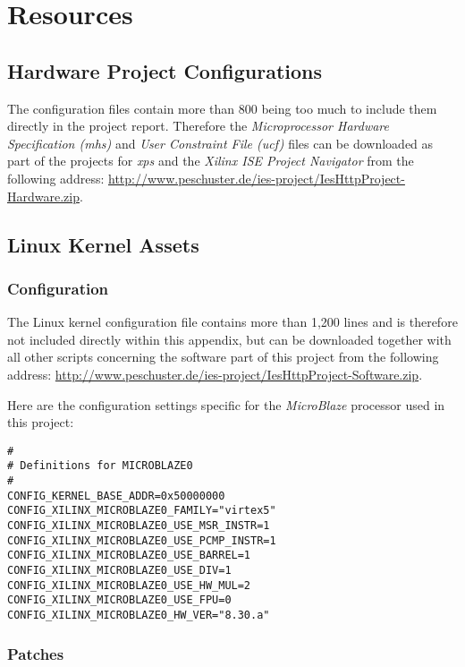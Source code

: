 \appendix 

\chapter{Resources}

\section{Hardware Project Configurations}

The configuration files contain more than 800 being too much to include them directly in the project report. Therefore the \textit{Microprocessor Hardware Specification (mhs)} and \textit{User Constraint File (ucf)} files can be downloaded as part of the projects for \textit{\gls{xps}} and the \textit{Xilinx ISE Project Navigator} from the following address: \url{http://www.peschuster.de/ies-project/IesHttpProject-Hardware.zip}.

\section{Linux Kernel Assets}

\subsection{Configuration}

The Linux kernel configuration file contains more than 1,200 lines and is therefore not included directly within this appendix, but can be downloaded together with all other scripts concerning the software part of this project from the following address: \url{http://www.peschuster.de/ies-project/IesHttpProject-Software.zip}.

Here are the configuration settings specific for the \textit{MicroBlaze} processor used in this project:

\begin{verbatim}
#
# Definitions for MICROBLAZE0
#
CONFIG_KERNEL_BASE_ADDR=0x50000000
CONFIG_XILINX_MICROBLAZE0_FAMILY="virtex5"
CONFIG_XILINX_MICROBLAZE0_USE_MSR_INSTR=1
CONFIG_XILINX_MICROBLAZE0_USE_PCMP_INSTR=1
CONFIG_XILINX_MICROBLAZE0_USE_BARREL=1
CONFIG_XILINX_MICROBLAZE0_USE_DIV=1
CONFIG_XILINX_MICROBLAZE0_USE_HW_MUL=2
CONFIG_XILINX_MICROBLAZE0_USE_FPU=0
CONFIG_XILINX_MICROBLAZE0_HW_VER="8.30.a"
\end{verbatim}

\subsection{Patches}


